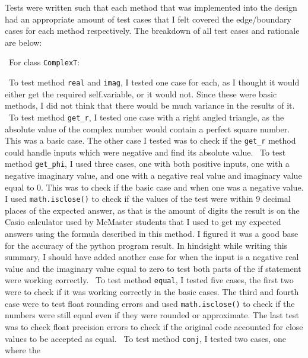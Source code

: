 \documentclass[12pt]{article}
\begin{document}
Tests were written such that each method that was implemented into the design
had an appropriate amount of test cases that I felt covered the edge/boundary 
cases for each method respectively. The breakdown of all test cases and 
rationale are below:

~\newline\noindent For class \verb|ComplexT|:

~\newline\noindent To test method \verb|real| and \verb|imag|, I tested one 
case for each, as I thought it would either get the required self.variable, 
or it would not. Since these were basic methods, I did not think that there 
would be much variance in the results of it. 
~\newline\noindent To test method \verb|get_r|, I tested one case with a right 
angled triangle, as the absolute value of the complex number would contain a 
perfect square number. This was a basic case. The other case I tested was to 
check if the \verb|get_r| method could handle inputs which were negative and 
find its absolute value. 
~\newline\noindent To test method \verb|get_phi|, I used three cases, one with 
both positive inputs, one with a negative imaginary value, and one with a negative 
real value and imaginary value equal to 0. This was to check if the basic case 
and when one was a negative value. I used \verb|math.isclose()| to check if the 
values of the test were within 9 decimal places of the expected answer, as that 
is the amount of digits the result is on the Casio calculator used by McMaster 
students that I used to get my expected answers using the formula described in 
this method. I figured it was a good base for the accuracy of the python program 
result. In hindsight while writing this summary, I should have added another case 
for when the input is a negative real value and the imaginary value equal to zero 
to test both parts of the if statement were working correctly. 
~\newline\noindent To test method \verb|equal|, I tested five cases, the first 
two were to check if it was working correctly in the basic cases. The third and 
fourth case were to test float rounding errors and used \verb|math.isclose()| to 
check if the numbers were still equal even if they were rounded or approximate. 
The last test was to check float precision errors to check if the original code 
accounted for close values to be accepted as equal. 
~\newline\noindent To test method \verb|conj|, I tested two cases, one where the 
\end{document}
